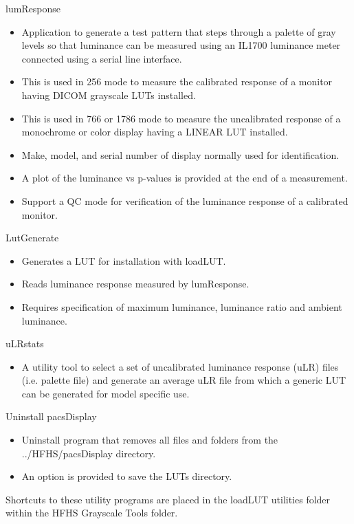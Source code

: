 lumResponse
\begin{itemize}
\item Application to generate a test pattern that steps through a palette of gray levels so that luminance can be measured using an IL1700 luminance meter connected using a serial line interface. 
\item This is used in 256 mode to measure the calibrated response of a monitor having DICOM grayscale LUTs installed. 
\item This is used in 766 or 1786 mode to measure the uncalibrated response of a mono\-chrome or color display having a LINEAR LUT installed. 
\item Make, model, and serial number of display normally used for identification. 
\item A plot of the luminance vs p-values is provided at the end of a measurement. 
\item Support a QC mode for verification of the luminance response of a calibrated monitor.
\end{itemize}

LutGenerate
\begin{itemize} 
\item Generates a LUT for installation with loadLUT. 
\item Reads luminance response measured by lumResponse. 
\item Requires specification of maximum luminance, luminance ratio and ambient luminance.
\end{itemize}

uLRstats
\begin{itemize}
\item A utility tool to select a set of uncalibrated luminance response (uLR) files (i.e. palette file) and generate an average uLR file from which a generic LUT can be generated for model specific use.
\end{itemize}

Uninstall pacsDisplay
\begin{itemize}
\item Uninstall program that removes all files and folders from the \textnormal{../HFHS/pacsDisplay} directory. 
\item An option is provided to save the LUTs directory.
\end{itemize}

Shortcuts to these utility programs are placed in the \textnormal{loadLUT utilities} folder within the \textnormal{HFHS Grayscale Tools} folder.

